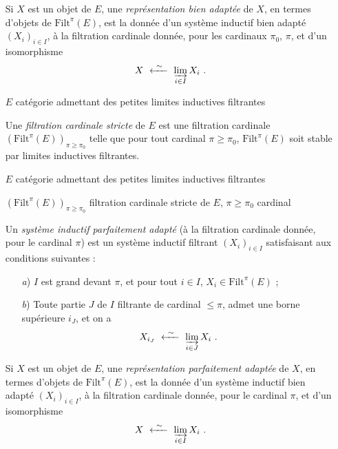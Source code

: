 \documentclass[11pt]{article}
\newcommand{\printedpage}[1]{\marginpar{\footnotesize p.~#1}}
\newcommand{\Filt}{\mathrm{Filt}}
\begin{document}
\begin{itemize}
\printedpage{63}

Si $X$ est un objet de $E$, une \textit{représentation bien adaptée} de $X$, en termes d'objets de $\Filt^{\pi}(E)$, est la donnée d'un système inductif bien adapté $(X_i)_{i\in I}$, à la filtration cardinale donnée, pour les cardinaux $\pi_0$, $\pi$, et d'un isomorphisme
\[
X \ \xleftarrow{\ \sim\ }\ \varinjlim_{i\in I} X_i \ .
\]

\item[\textbullet] $E$ catégorie admettant des petites limites inductives filtrantes

Une \textit{filtration cardinale stricte} de $E$ est une filtration cardinale $(\Filt^{\pi}(E))_{\pi\geq\pi_0}$ telle que pour tout cardinal $\pi \geq \pi_0$, $\Filt^{\pi}(E)$ soit stable par limites inductives filtrantes.

\item[\textbullet] $E$ catégorie admettant des petites limites inductives filtrantes

$(\Filt^{\pi}(E))_{\pi\geq\pi_0}$ filtration cardinale stricte de $E$, \quad $\pi \geq \pi_0$ cardinal

Un \textit{système inductif parfaitement adapté} (à la filtration cardinale donnée, pour le cardinal $\pi$) est un système inductif filtrant $(X_i)_{i\in I}$ satisfaisant aux conditions suivantes :
\begin{itemize}
\item[\textit{a})] $I$ est grand devant $\pi$, et pour tout $i \in I$, $X_i \in \Filt^{\pi}(E)$ ;
\item[\textit{b})] Toute partie $J$ de $I$ filtrante de cardinal $\leq \pi$, admet une borne supérieure $i_J$, et on a
\[
X_{i_J} \ \xleftarrow{\ \sim\ }\ \varinjlim_{i\in J} X_i \ .
\]
\end{itemize}
Si $X$ est un objet de $E$, une \textit{représentation parfaitement adaptée} de $X$, en termes d'objets de $\Filt^{\pi}(E)$, est la donnée d'un système inductif bien adapté $(X_i)_{i\in I}$, à la filtration cardinale donnée, pour le cardinal $\pi$, et d'un isomorphisme
\[
X \ \xleftarrow{\ \sim\ }\ \varinjlim_{i\in I} X_i \ .
\]
\end{itemize}
\end{document}
